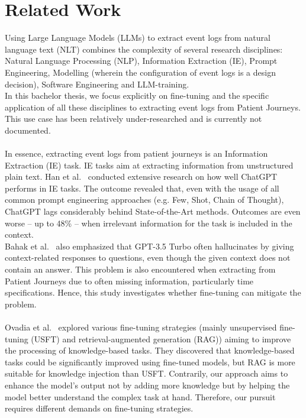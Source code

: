 \section{Related Work}
\label{sec:related_work}
Using Large Language Models (LLMs) to extract event logs from natural language text (NLT) combines the complexity of several research disciplines: Natural Language Processing (NLP), Information Extraction (IE), Prompt Engineering, Modelling (wherein the configuration of event logs is a design decision), Software Engineering and LLM-training.\\
In this bachelor thesis, we focus explicitly on fine-tuning and the specific application of all these disciplines to extracting event logs from Patient Journeys. This use case has been relatively under-researched and is currently not documented.\\\\
In essence, extracting event logs from patient journeys is an Information Extraction (IE) task. IE tasks aim at extracting information from unstructured plain text. Han et al.~\cite{han_is_2023} conducted extensive research on how well ChatGPT performs in IE tasks. The outcome revealed that, even with the usage of all common prompt engineering approaches (e.g. Few, Shot, Chain of Thought), ChatGPT lags considerably behind State-of-the-Art methods. Outcomes are even worse – up to 48\% – when irrelevant information for the task is included in the context.\\
Bahak et al.~\cite{bahak_evaluating_2023} also emphasized that GPT-3.5 Turbo often hallucinates by giving context-related responses to questions, even though the given context does not contain an answer. This problem is also encountered when extracting from Patient Journeys due to often missing information, particularly time specifications. Hence, this study investigates whether fine-tuning can mitigate the problem.\\\\
Ovadia et al.~\cite{ovadia_fine-tuning_2024} explored various fine-tuning strategies (mainly unsupervised fine-tuning (USFT) and retrieval-augmented generation (RAG)) aiming to improve the processing of knowledge-based tasks. They discovered that knowledge-based tasks could be significantly improved using fine-tuned models, but RAG is more suitable for knowledge injection than USFT. Contrarily, our approach aims to enhance the model's output not by adding more knowledge but by helping the model better understand the complex task at hand. Therefore, our pursuit requires different demands on fine-tuning strategies.\\\\
